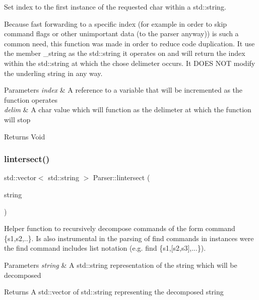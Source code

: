 Set index to the first instance of the requested char within a std\+::string. 

Because fast forwarding to a specific index (for example in order to skip command flags or other unimportant data (to the parser anyway)) is such a common need, this function was made in order to reduce code duplication. It use the member \+\_\+string as the std\+::string it operates on and will return the index within the std\+::string at which the chose delimeter occurs. It D\+O\+ES N\+OT modify the underling string in any way.


\begin{DoxyParams}{Parameters}
{\em index} & A reference to a variable that will be incremented as the function operates\\
\hline
{\em delim} & A char value which will function as the delimeter at which the function will stop\\
\hline
\end{DoxyParams}
\begin{DoxyReturn}{Returns}
Void 
\end{DoxyReturn}
\mbox{\label{class_parser_af09e013dcba70865bdff465a7dafba6a}} 
\subsubsection{\texorpdfstring{lintersect()}{lintersect()}}
{\footnotesize\ttfamily std\+::vector$<$ std\+::string $>$ Parser\+::lintersect (\begin{DoxyParamCaption}\item[{std\+::string}]{string }\end{DoxyParamCaption})\hspace{0.3cm}{\ttfamily [private]}}

Helper function to recursively decompose commands of the form \textquotesingle{}command \{s1,s2,..\}\textquotesingle{}. Is also instrumental in the parsing of \textquotesingle{}find\textquotesingle{} commands in instances were the find command includes list notation (e.\+g. \textquotesingle{}find \{s1,\mbox{[}s2,s3\mbox{]},...\}\textquotesingle{}).


\begin{DoxyParams}{Parameters}
{\em string} & A std\+::string representation of the string which will be decomposed\\
\hline
\end{DoxyParams}
\begin{DoxyReturn}{Returns}
A std\+::vector of std\+::string representing the decomposed string 
\end{DoxyReturn}
\mbox{\label{class_parser_ac786ab202a25c76a069e124d1bdaa780}} 

